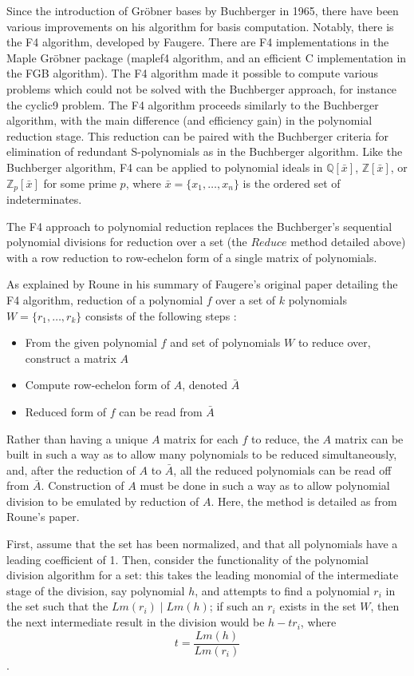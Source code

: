 \documentclass[letterpaper,12pt,titlepage,oneside,final]{book}
\begin{document}
Since the introduction of Gr\"obner bases by Buchberger in 1965, there have been various improvements on his algorithm for basis computation.  Notably, there is the F4 algorithm, developed by Faugere.  There are F4 implementations in the Maple Gr\"obner package (maplef4 algorithm, and an efficient C implementation in the FGB algorithm).  The F4 algorithm made it possible to compute various problems which could not be solved with the Buchberger approach, for instance the cyclic9 problem.  The F4 algorithm proceeds similarly to the Buchberger algorithm, with the main difference (and efficiency gain) in the polynomial reduction stage.  This reduction can be paired with the Buchberger criteria for elimination of redundant S-polynomials as in the Buchberger algorithm.  Like the Buchberger algorithm, F4 can be applied to polynomial ideals in ${\mathbb{Q}[\bar x]}$, ${\mathbb{Z}[\bar x]}$, or ${\mathbb{Z}_p[\bar x]}$ for some prime ${p}$, where ${\bar x = \{x_1, \ldots, x_n\}}$ is the ordered set of indeterminates.   

The F4 approach to polynomial reduction replaces the Buchberger's sequential polynomial divisions for reduction over a set (the ${Reduce}$ method detailed above) with a row reduction to row-echelon form of a single matrix of polynomials.

As explained by Roune in his summary of Faugere's original paper detailing the F4 algorithm, reduction of a polynomial ${f}$ over a set of ${k}$ polynomials ${W = \{r_1, \ldots, r_k\}}$ consists of the following steps \cite{Roune}:
\begin{itemize}
  \item From the given polynomial ${f}$ and set of polynomials ${W}$ to reduce over, construct a matrix ${A}$
  \item Compute row-echelon form of ${A}$, denoted ${\bar A}$
  \item Reduced form of ${f}$ can be read from ${\bar A}$
\end{itemize}      

Rather than having a unique ${A}$ matrix for each ${f}$ to reduce, the ${A}$ matrix can be built in such a way as to allow many polynomials to be reduced simultaneously, and, after the reduction of ${A}$ to ${\bar A}$, all the reduced polynomials can be read off from ${\bar A}$.  Construction of ${A}$ must be done in such a way as to allow polynomial division to be emulated by reduction of ${A}$.  Here, the method is detailed as from Roune's paper.

First, assume that the set has been normalized, and that all polynomials have a leading coefficient of 1.  Then, consider the functionality of the polynomial division algorithm for a set: this takes the leading monomial of the intermediate stage of the division, say polynomial ${h}$, and attempts to find a polynomial ${r_i}$ in the set such that the ${Lm(r_i) \mid Lm(h)}$; if such an ${r_i}$ exists in the set ${W}$, then the next intermediate result in the division would be ${h - tr_i}$, where $${t = \frac{Lm(h)}{Lm(r_i)}}$$.  
\end{document}
